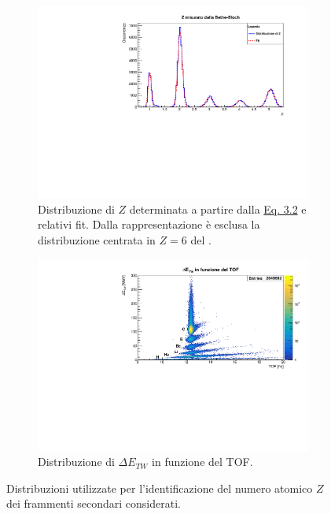 \documentclass[12pt,a4paper,twoside]{report}
\begin{document}
	\begin{figure}[H]
		\centering
		\begin{subfigure}[t]{1.\textwidth}
			\centering
			\includegraphics[width=\textwidth, scale=0.50]{c_z.pdf}
			\caption{Distribuzione di $Z$ determinata a partire dalla \hyperref[eq:atomic_number]{Eq. 3.2} e relativi fit. Dalla rappresentazione è esclusa la distribuzione centrata in $Z=6$ del .}
			\label{fig:atomic_numbersa}
		\end{subfigure}
		\par
		\begin{subfigure}[t]{1.\textwidth}
			\centering
			\includegraphics[width=\textwidth, scale=0.50]{c_E_TOFLog.pdf}
			\caption{Distribuzione di $\Delta E_{TW}$ in funzione del TOF.}
			\label{fig:atomic_numbersb}
		\end{subfigure}
		\caption{Distribuzioni utilizzate per l'identificazione del numero atomico $Z$ dei frammenti secondari considerati.}
		\label{fig:atomic_numbers}
	\end{figure}
	
\end{document}
